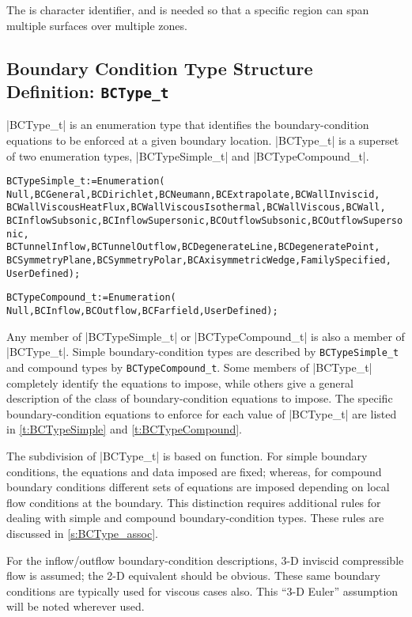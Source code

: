 The  is character identifier, and is needed so that a
specific region can span multiple surfaces over multiple zones.

\subsection{Boundary Condition Type Structure Definition: \texttt{BCType\_t}} 
\label{s:BCType}

|BCType_t| is an enumeration type that identifies the boundary-condition
equations to be enforced at a given boundary location.
|BCType_t| is a superset of two enumeration types, |BCTypeSimple_t|
and |BCTypeCompound_t|.
\begin{alltt}
  BCTypeSimple\_t := Enumeration(
    Null, BCGeneral, BCDirichlet, BCNeumann, BCExtrapolate, BCWallInviscid, 
    BCWallViscousHeatFlux, BCWallViscousIsothermal, BCWallViscous, BCWall,
    BCInflowSubsonic, BCInflowSupersonic, BCOutflowSubsonic, BCOutflowSupersonic,
    BCTunnelInflow, BCTunnelOutflow, BCDegenerateLine, BCDegeneratePoint,
    BCSymmetryPlane, BCSymmetryPolar, BCAxisymmetricWedge, FamilySpecified,
    UserDefined ) ;
\end{alltt}

\begin{alltt}
  BCTypeCompound\_t := Enumeration( 
    Null, BCInflow, BCOutflow, BCFarfield, UserDefined ) ;
\end{alltt}

Any member of |BCTypeSimple_t| or |BCTypeCompound_t| is also a member
of |BCType_t|.
Simple boundary-condition types are described by \texttt{BCTypeSimple\_t}
and compound types by \texttt{BCTypeCompound\_t}.
Some members of |BCType_t| completely identify the equations to
impose, while others give a general description of the class of
boundary-condition equations to impose.
The specific boundary-condition equations to enforce for each value
of |BCType_t| are listed in \autoref{t:BCTypeSimple} and
\autoref{t:BCTypeCompound}.

The subdivision of |BCType_t| is based on function.  For simple
boundary conditions, the equations and data imposed are fixed; whereas,
for compound boundary conditions different sets of equations are
imposed depending on local flow conditions at the boundary.  This
distinction requires additional rules for dealing with simple and
compound boundary-condition types.  These rules are discussed in
\autoref{s:BCType_assoc}.

For the inflow/outflow boundary-condition descriptions, 3-D inviscid
compressible flow is assumed; the 2-D equivalent should be obvious.
These same boundary conditions are typically used for viscous cases
also.  This ``3-D Euler'' assumption will be noted wherever used.

